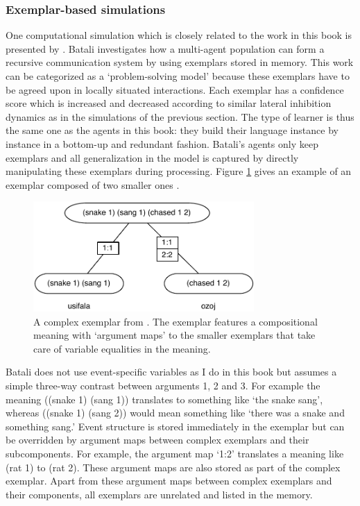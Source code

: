 \subsubsection{Exemplar-based simulations}
 One computational simulation which is closely related to the work in this book is presented by \citet{batali02negotiation}. Batali investigates how a multi-agent population can form a recursive communication system by using exemplars stored in memory. This work can be categorized as a `problem-solving model' because these exemplars have to be agreed upon in locally situated interactions. Each exemplar has a confidence score which is increased and decreased according to similar lateral inhibition dynamics as in the simulations of the previous section. The type of learner is thus the same one as the agents in this book: they build their language instance by instance in a bottom-up and redundant fashion. Batali's agents only keep exemplars and all generalization in the model is captured by directly manipulating these exemplars during processing. Figure \ref{f:batali} gives an example of an exemplar composed of two smaller ones \citep[exemplar 5.1.2.a]{batali02negotiation}.
\begin{figure}[h]
\centerline{\includegraphics[width=0.75\textwidth]{Chapter4/figs/batali}}
  \caption[An exemplar \citep{batali02negotiation}]{A complex exemplar from \citet{batali02negotiation}. The exemplar features a compositional meaning with `argument maps' to the smaller exemplars that take care of variable equalities in the meaning.}
   \label{f:batali}
\end{figure}

Batali does not use event-specific variables as I do in this book but assumes a simple three-way contrast between arguments 1, 2 and 3. For example the meaning ((snake 1) (sang 1)) translates to something like `the snake sang', whereas ((snake 1) (sang 2)) would mean something like `there was a snake and something sang.' Event structure is stored immediately in the exemplar but can be overridden by argument maps between complex exemplars and their subcomponents. For example, the argument map `1:2' translates a meaning like (rat 1) to (rat 2). These argument maps are also stored as part of the complex exemplar. Apart from these argument maps between complex exemplars and their components, all exemplars are unrelated and listed in the memory.

